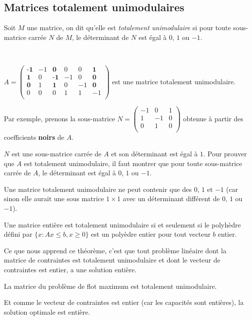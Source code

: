 \documentclass[a4paper]{article}
\begin{document}
\subsection{Matrices totalement unimodulaires}
\begin{definition}
Soit $M$ une matrice, on dit qu'elle est \emph{totalement unimodulaire} si pour toute sous-matrice carrée $N$ de $M$, le déterminant de $N$ est égal à $0$, $1$ ou $-1$.
\end{definition}
\begin{eg}\,

	$A = \begin{pmatrix}
	\textbf{-1} & -1 & \textbf{0} & 0 & 0 & \textbf{1} \\
	\textbf{1} & 0 & \textbf{-1} & -1 & 0 & \textbf{0} \\
	\textbf{0} & 1 & \textbf{1} & 0 & -1 & \textbf{0} \\
	0 & 0 & 0 & 1 & 1 & -1 \\
	\end{pmatrix}$ est une matrice totalement unimodulaire.

	Par exemple, prenons la sous-matrice $N = \begin{pmatrix}
	-1 & 0 & 1 \\
	1 & -1 & 0 \\
	0 & 1 & 0 \\
	\end{pmatrix}$ obtenue à partir des coefficients \textbf{noirs} de $A$.

	$N$ est une sous-matrice carrée de $A$ et son déterminant est égal à $1$. Pour prouver que $A$ est totalement unimodulaire, il faut montrer que pour toute sous-matrice carrée de $A$, le déterminant est égal à $0$, $1$ ou $-1$.
\end{eg}
\begin{remark}
	Une matrice totalement unimodulaire ne peut contenir que des $0$, $1$ et $-1$ (car sinon elle aurait une sous matrice $1\times 1$ avec un déterminant différent de $0$, $1$ ou $-1$).
\end{remark}
\begin{theorem}
Une matrice entière est totalement unimodulaire si et seulement si le polyhèdre défini par $\{x : Ax \leq b, x \geq 0\}$ est un polyèdre entier pour tout vecteur $b$ entier.
\end{theorem}

Ce que nous apprend ce théorème, c'est que tout problème linéaire dont la matrice de contraintes est totalement unimodulaire et dont le vecteur de contraintes est entier, a une solution entière.
\begin{theorem}
La matrice du problème de flot maximum est totalement unimodulaire.
\end{theorem}
Et comme le vecteur de contraintes est entier (car les capacités sont entières), la solution optimale est entière.
\end{document}
